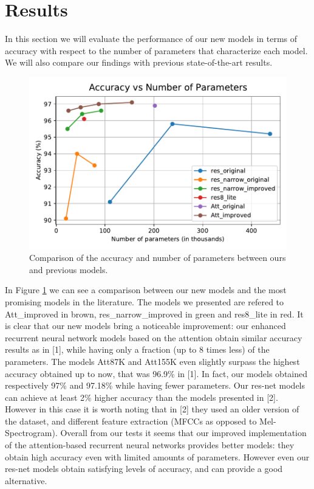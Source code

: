 
\section{Results}
\label{sec:results}

In this section we will evaluate the performance of our new models in terms of accuracy with respect to the number of parameters that characterize each model. We will also compare our findings with previous state-of-the-art results.

\begin{figure}[htbp]
\centerline{\includegraphics[scale=.6]{acc_vs_par.pdf}}
\caption{Comparison of the accuracy and number of parameters between ours and previous models.}
\label{avp}
\end{figure}

In Figure \ref{avp} we can see a comparison between our new models and the most promising models in the literature. The models we presented are refered to Att\_improved in brown, res_narrow_improved in green and res8_lite in red.
It is clear that our new models bring a noticeable improvement: our enhanced recurrent neural network models based on the attention obtain similar accuracy results as in [1], while having only a fraction (up to 8 times less) of the parameters. The models Att87K and Att155K even slightly surpass the highest accuracy obtained up to now, that was 96.9\% in [1]. In fact, our models obtained respectively 97\% and 97.18\% while having fewer parameters. 
Our res-net models can achieve at least 2\% higher accuracy than the models presented in [2]. However in this case it is worth noting that in [2] they used an older version of the dataset, and different feature extraction (MFCCs as opposed to Mel-Spectrogram). Overall from our tests it seems that our improved implementation of the attention-based recurrent neural networks provides better models: they obtain high accuracy even with limited amounts of parameters. However even our res-net models obtain satisfying levels of accuracy, and can provide a good alternative.

